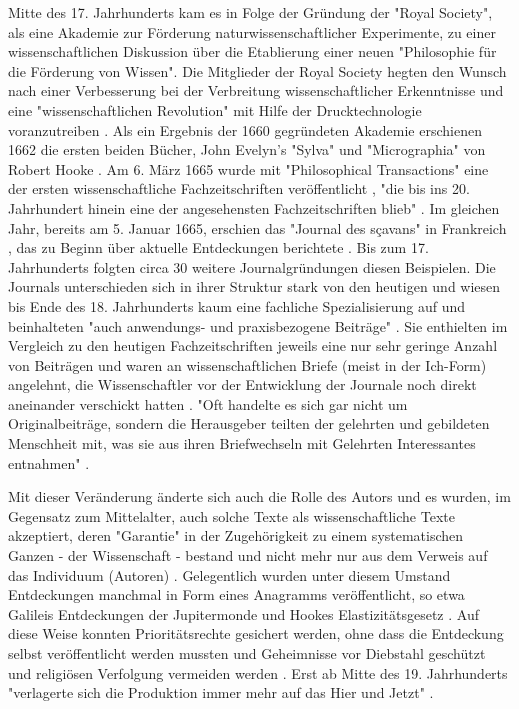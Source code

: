 Mitte des 17. Jahrhunderts kam es in Folge der Gründung der "Royal Society", als eine Akademie zur Förderung naturwissenschaftlicher Experimente, zu einer wissenschaftlichen Diskussion über die Etablierung einer neuen "Philosophie für die Förderung von Wissen". Die Mitglieder der Royal Society hegten den Wunsch nach einer Verbesserung bei der Verbreitung wissenschaftlicher Erkenntnisse und eine "wissenschaftlichen Revolution" mit Hilfe der Drucktechnologie voranzutreiben \cite{Dear_1985}. Als ein Ergebnis der 1660 gegründeten Akademie erschienen 1662 die ersten beiden Bücher, John Evelyn's "Sylva" und "Micrographia" von Robert Hooke \cite{hall_1992_library_rsol}. Am 6. März 1665 wurde mit "Philosophical Transactions" eine der ersten wissenschaftliche Fachzeitschriften veröffentlicht \cite{Peters_2014}, "die bis ins 20. Jahrhundert hinein eine der angesehensten Fachzeitschriften blieb" \cite{graefen2007_wissenschaftliche_artikel}. Im gleichen Jahr, bereits am  5. Januar 1665, erschien das "Journal des sçavans" in Frankreich \cite{ball_2011_zeitalter}, \cite{hollricher_wandel_2009} das zu Beginn über aktuelle Entdeckungen berichtete \cite{epaa_Weiner_2001}. Bis zum 17. Jahrhunderts folgten circa 30 weitere Journalgründungen diesen Beispielen. Die Journals unterschieden sich in ihrer Struktur stark von den heutigen und wiesen bis Ende des 18. Jahrhunderts kaum eine fachliche Spezialisierung auf und beinhalteten "auch anwendungs- und praxisbezogene Beiträge" \cite{graefen2007_wissenschaftliche_artikel}. Sie enthielten im Vergleich zu den heutigen Fachzeitschriften jeweils eine nur sehr geringe Anzahl von Beiträgen \cite{suchen} und waren an wissenschaftlichen Briefe (meist in der Ich-Form) angelehnt, die Wissenschaftler vor der Entwicklung der Journale noch direkt aneinander verschickt hatten \cite{epaa_Weiner_2001}. "Oft handelte es sich gar nicht um Originalbeiträge, sondern die Herausgeber teilten der gelehrten und gebildeten Menschheit mit, was sie aus ihren Briefwechseln mit Gelehrten Interessantes entnahmen" \cite{graefen2007_wissenschaftliche_artikel}.

Mit dieser Veränderung änderte sich auch die Rolle des Autors und es wurden, im Gegensatz zum Mittelalter, auch solche Texte als wissenschaftliche Texte akzeptiert, deren "Garantie" in der Zugehörigkeit zu einem systematischen Ganzen - der Wissenschaft - bestand und nicht mehr nur aus dem Verweis auf das Individuum (Autoren) \cite{foucault_2000_autor}. Gelegentlich wurden unter diesem Umstand Entdeckungen manchmal in Form eines Anagramms veröffentlicht, so etwa Galileis Entdeckungen der Jupitermonde \cite{miner2007discovery} und Hookes Elastizitätsgesetz \cite{szabo_2013_geschichte}. Auf diese Weise konnten Prioritätsrechte gesichert werden, ohne dass die Entdeckung selbst veröffentlicht werden mussten \cite{miner2007discovery} und Geheimnisse vor Diebstahl geschützt und religiösen Verfolgung vermeiden werden \cite{resnik_2005_ethics}. Erst ab Mitte des 19. Jahrhunderts "verlagerte sich die Produktion immer mehr auf das Hier und Jetzt" \cite{hagner_2015_sache_buches}.

